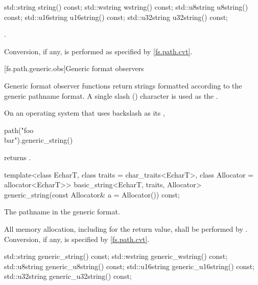 %
%
%
%
%
\begin{itemdecl}
std::string string() const;
std::wstring wstring() const;
std::u8string u8string() const;
std::u16string u16string() const;
std::u32string u32string() const;
\end{itemdecl}

\begin{itemdescr}
\pnum
\returns {}.

\pnum
\remarks Conversion, if any, is performed as specified
by \ref{fs.path.cvt}.
\end{itemdescr}


[fs.path.generic.obs]{Generic format observers}

\pnum
Generic format observer functions return strings formatted according to the
generic pathname format.
A single slash () character is used as
the .

\pnum
\begin{example} On an operating system that uses backslash as
its ,
\begin{codeblock}
path("foo\\bar").generic_string()
\end{codeblock}
returns . \end{example}

%
\begin{itemdecl}
template<class EcharT, class traits = char_traits<EcharT>,
         class Allocator = allocator<EcharT>>
  basic_string<EcharT, traits, Allocator>
    generic_string(const Allocator& a = Allocator()) const;
\end{itemdecl}

\begin{itemdescr}
\pnum
\returns The pathname in the generic format.

\pnum
\remarks All memory allocation, including for the return value, shall
be performed by . Conversion, if any, is specified by
\ref{fs.path.cvt}.
\end{itemdescr}

%
%
%
%
%
\begin{itemdecl}
std::string generic_string() const;
std::wstring generic_wstring() const;
std::u8string generic_u8string() const;
std::u16string generic_u16string() const;
std::u32string generic_u32string() const;
\end{itemdecl}

